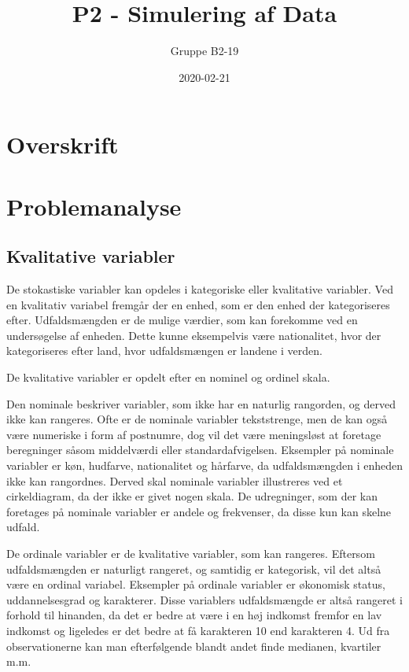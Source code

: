 \documentclass[
]{book}
\title{P2 - Simulering af Data}
\author{Gruppe B2-19}
\date{2020-02-21}
\theoremstyle{definition}
\theoremstyle{definition}
\theoremstyle{definition}
\theoremstyle{remark}
\begin{document}
\maketitle

{
\setcounter{tocdepth}{1}
\tableofcontents
}
\hypertarget{overskrift}{%
\chapter{Overskrift}\label{overskrift}}

\hypertarget{problemanalyse}{%
\chapter{Problemanalyse}\label{problemanalyse}}

\hypertarget{kvalitative-variabler}{%
\section{Kvalitative variabler}\label{kvalitative-variabler}}

De stokastiske variabler kan opdeles i kategoriske eller kvalitative variabler. Ved en kvalitativ variabel fremgår der en enhed, som er den enhed der kategoriseres efter. Udfaldsmængden er de mulige værdier, som kan forekomme ved en undersøgelse af enheden. Dette kunne eksempelvis være nationalitet, hvor der kategoriseres efter land, hvor udfaldsmængen er landene i verden.

De kvalitative variabler er opdelt efter en nominel og ordinel skala.

Den nominale beskriver variabler, som ikke har en naturlig rangorden, og derved ikke kan rangeres. Ofte er de nominale variabler tekststrenge, men de kan også være numeriske i form af postnumre, dog vil det være meningsløst at foretage beregninger såsom middelværdi eller standardafvigelsen. Eksempler på nominale variabler er køn, hudfarve, nationalitet og hårfarve, da udfaldsmængden i enheden ikke kan rangordnes. Derved skal nominale variabler illustreres ved et cirkeldiagram, da der ikke er givet nogen skala. De udregninger, som der kan foretages på nominale variabler er andele og frekvenser, da disse kun kan skelne udfald.

De ordinale variabler er de kvalitative variabler, som kan rangeres. Eftersom udfaldsmængden er naturligt rangeret, og samtidig er kategorisk, vil det altså være en ordinal variabel. Eksempler på ordinale variabler er økonomisk status, uddannelsesgrad og karakterer. Disse variablers udfaldsmængde er altså rangeret i forhold til hinanden, da det er bedre at være i en høj indkomst fremfor en lav indkomst og ligeledes er det bedre at få karakteren 10 end karakteren 4. Ud fra observationerne kan man efterfølgende blandt andet finde medianen, kvartiler m.m.
\end{document}
